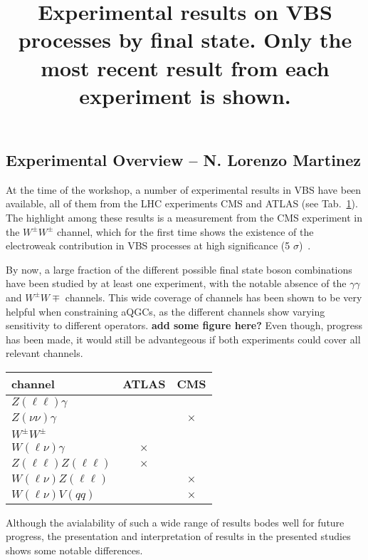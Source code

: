 \label{WG2}

\subsection{Experimental Overview -- N. Lorenzo Martinez}
At the time of the workshop, a number of experimental results in VBS have been available, all of them from the LHC experiments CMS and ATLAS (see Tab.~\ref{tab:wg1:expres}). The highlight among these results is a measurement from the CMS experiment in the $W^\pm W^\pm$ channel, which for the first time shows the existence of the electroweak contribution in VBS processes at high significance (5 $\sigma$)~\cite{CMS:2017adb}.

By now, a large fraction of the different possible final state boson combinations have been studied by at least one experiment, with the notable absence of the $\gamma\gamma$ and $W^\pm W\mp$ channels. This wide coverage of channels has been shown to be very helpful when constraining aQGCs, as the different channels show varying sensitivity to different operators.
\textbf{add some figure here?} Even though, progress has been made, it would still be advantegeous if both experiments could cover all relevant channels.

\begin{table}[htb]
\centering
\label{tab:wg1:expres}
\title{Experimental results on VBS processes by final state. Only the most recent result from each experiment is shown.}
\begin{tabular}{|l|c|c|}
    \hline
    channel & ATLAS & CMS \\
    \hline
    $Z(\ell\ell)\gamma$ & \cite{Aaboud:2017pds} & \cite{Khachatryan:2017jub} \\
    $Z(\nu\nu)\gamma$ &  \cite{Aaboud:2017pds}& $\times$ \\
    $W^\pm W^\pm$ & \cite{Aaboud:2016ffv} & \cite{CMS:2017adb} \\
    $W(\ell\nu)\gamma$ & $\times$ & \cite{Khachatryan:2016vif} \\
    $Z(\ell\ell)Z(\ell\ell)$&  $\times$  & \cite{CMS-PAS-SMP-17-006} \\
    $W(\ell\nu)Z(\ell\ell)$ & \cite{Aad:2016ett} & $\times$ \\
    $W(\ell\nu)V(qq)$ & \cite{Aaboud:2016uuk} & $\times$ \\
    \hline
  \end{tabular}  
\end{table}

Although the avialability of such a wide range of results bodes well for future progress, the presentation and interpretation of results in the presented studies shows some notable differences.

